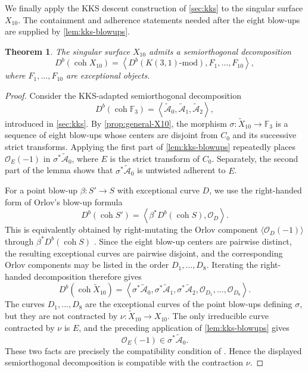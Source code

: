 \documentclass[11pt]{article}
\theoremstyle{plain}
\newtheorem{theorem}{Theorem}[section]
\theoremstyle{definition}
\theoremstyle{remark}
\newcommand{\F}{\mathbb F}
\newcommand{\Db}{D^b}
\newcommand{\coh}{\operatorname{coh}}
\newcommand{\OO}{\mathcal O}
\begin{document}
We finally apply the KKS descent construction of \cref{sec:kks} to the
singular surface \(X_{10}\). The containment and adherence statements needed
after the eight blow-ups are supplied by \cref{lem:kks-blowups}.

\begin{theorem}
\label{thm:X10-kks-sod}
The singular surface \(X_{10}\) admits a semiorthogonal decomposition
\[
\Db(\coh X_{10})
=
\left\langle
\Db(K(3,1)\text{-mod}),F_1,\dots,F_{10}
\right\rangle,
\]
where \(F_1,\dots,F_{10}\) are exceptional objects.
\end{theorem}

\begin{proof}
Consider the KKS-adapted semiorthogonal decomposition
\[
\Db(\coh \F_3)
=
\left\langle
\widetilde{\mathcal A}_0,
\widetilde{\mathcal A}_1,
\widetilde{\mathcal A}_2
\right\rangle,
\]
introduced in \cref{sec:kks}. By
\cref{prop:general-X10}, the
morphism \(\sigma:\widetilde X_{10}\to\F_3\) is a sequence of eight blow-ups
whose centers are disjoint from \(C_0\) and its successive strict transforms.
Applying the first part of \cref{lem:kks-blowups} repeatedly places
\(\OO_E(-1)\) in \(\sigma^*\widetilde{\mathcal A}_0\), where \(E\) is the
strict transform of \(C_0\). Separately, the second part of the lemma shows
that \(\sigma^*\widetilde{\mathcal A}_0\) is untwisted adherent to \(E\).

For a point blow-up \(\beta:S'\to S\) with exceptional curve \(D\), we use
the right-handed form of Orlov's blow-up formula
\[
\Db(\coh S')
=
\left\langle
\beta^*\Db(\coh S),\OO_D
\right\rangle.
\]
This is equivalently obtained by right-mutating the Orlov component
\(\langle\OO_D(-1)\rangle\) through \(\beta^*\Db(\coh S)\)
\cite[Theorem~1.6]{Kuznetsov2014}. Since the eight blow-up centers are
pairwise distinct, the resulting exceptional curves are pairwise disjoint,
and the corresponding Orlov components may be listed in the order
\(D_1,\dots,D_8\). Iterating the right-handed decomposition therefore gives
\[
\Db(\coh\widetilde X_{10})
=
\left\langle
\sigma^*\widetilde{\mathcal A}_0,
\sigma^*\widetilde{\mathcal A}_1,
\sigma^*\widetilde{\mathcal A}_2,
\OO_{D_1},\dots,\OO_{D_8}
\right\rangle.
\]
The curves \(D_1,\dots,D_8\) are the exceptional curves of the point
blow-ups defining \(\sigma\), but they are not contracted by
\(\nu:\widetilde X_{10}\to X_{10}\). The only irreducible curve contracted
by \(\nu\) is \(E\), and the preceding application of
\cref{lem:kks-blowups} gives
\[
\OO_E(-1)\in\sigma^*\widetilde{\mathcal A}_0.
\]
These two facts are precisely the compatibility condition of
\cite[Definition~2.7]{KKS2020}. Hence the displayed semiorthogonal
decomposition is compatible with the contraction \(\nu\).


\end{proof}
\end{document}
